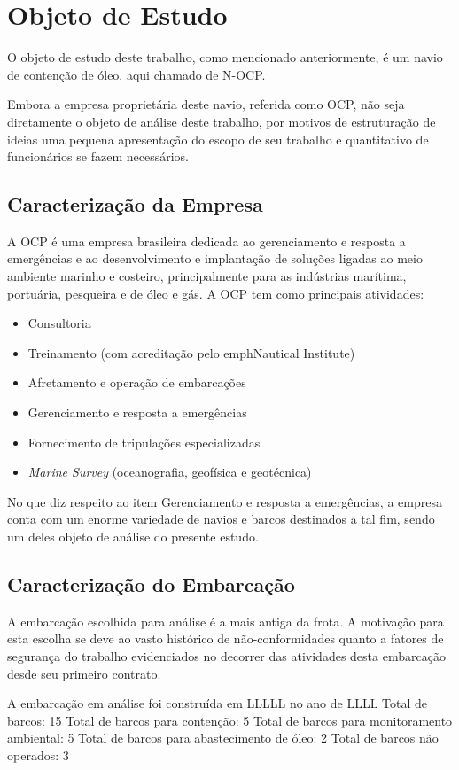 \chapter{Objeto de Estudo}
O objeto de estudo deste trabalho, como mencionado anteriormente, é um navio de contenção de óleo, aqui chamado de N-OCP. 

Embora a empresa proprietária deste navio, referida como OCP, não seja diretamente o objeto de análise deste trabalho, por motivos de estruturação de ideias uma pequena apresentação do escopo de seu trabalho e quantitativo de funcionários se fazem necessários.

\section{Caracterização da Empresa}
A OCP é uma empresa brasileira dedicada ao gerenciamento e resposta a emergências e ao desenvolvimento e implantação de soluções ligadas ao meio ambiente marinho e costeiro, principalmente para as indústrias marítima, portuária, pesqueira e de óleo e gás.
A OCP tem como principais atividades:
\begin{itemize}
\item Consultoria
\item Treinamento (com acreditação pelo emph{Nautical Institute})
\item Afretamento e operação de embarcações
\item Gerenciamento e resposta a emergências
\item Fornecimento de tripulações especializadas
\item \emph{Marine Survey} (oceanografia, geofísica e geotécnica)
\end{itemize}

No que diz respeito ao item Gerenciamento e resposta a emergências, a empresa conta com um enorme variedade de navios e barcos destinados a tal fim, sendo um deles objeto de análise do presente estudo.

\section{Caracterização do Embarcação}
A embarcação escolhida para análise é a mais antiga da frota. A motivação para esta escolha se deve ao vasto histórico de não-conformidades quanto a fatores de segurança do trabalho evidenciados no decorrer das atividades desta embarcação desde seu primeiro contrato.

A embarcação em análise foi construída em LLLLL no ano de LLLL
Total de barcos: 15
Total de barcos para contenção: 5
Total de barcos para monitoramento ambiental: 5
Total de barcos para abastecimento de óleo: 2
Total de barcos não operados: 3